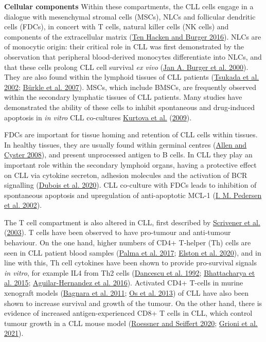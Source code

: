 \documentclass[11pt, a4paper, twosided]{book}
\begin{document}
\textbf{Cellular components}
Within these compartments, the CLL cells engage in a dialogue with mesenchymal stromal cells (MSCs), NLCs and follicular dendritic cells (FDCs), in concert with T cells, natural killer cells (NK cells) and components of the extracellular matrix (\protect\hyperlink{ref-tenHacken2016}{Ten Hacken and Burger 2016}). NLCs are of monocytic origin: their critical role in CLL was first demonstrated by the observation that peripheral blood-derived monocytes differentiate into NLCs, and that these cells prolong CLL cell survival \emph{ex vivo} (\protect\hyperlink{ref-Burger2000}{Jan A. Burger et al. 2000}). They are also found within the lymphoid tissues of CLL patients (\protect\hyperlink{ref-Tsukada2002}{Tsukada et al. 2002}; \protect\hyperlink{ref-Burkle2007}{Bürkle et al. 2007}). MSCs, which include BMSCs, are frequently observed within the secondary lymphatic tissues of CLL patients. Many studies have demonstrated the ability of these cells to inhibit spontaneous and drug-induced apoptosis in \emph{in vitro} CLL co-cultures \protect\hyperlink{ref-Kurtova2009}{Kurtova et al.} (\protect\hyperlink{ref-Kurtova2009}{2009}).

FDCs are important for tissue homing and retention of CLL cells within tissues. In healthy tissues, they are usually found within germinal centres (\protect\hyperlink{ref-Allen2008}{Allen and Cyster 2008}), and present unprocessed antigen to B cells. In CLL they play an important role within the secondary lymphoid organs, having a protective effect on CLL via cytokine secreton, adhesion molecules and the activation of BCR signalling (\protect\hyperlink{ref-Dubois2020}{Dubois et al. 2020}). CLL co-culture with FDCs leads to inhibition of spontaneous apoptosis and upregulation of anti-apoptotic MCL-1 (\protect\hyperlink{ref-Pedersen2002}{I. M. Pedersen et al. 2002}).

The T cell compartment is also altered in CLL, first described by \protect\hyperlink{ref-Scrivener2003}{Scrivener et al.} (\protect\hyperlink{ref-Scrivener2003}{2003}). T cells have been observed to have pro-tumour and anti-tumour behaviour. On the one hand, higher numbers of CD4+ T-helper (Th) cells are seen in CLL patient blood samples (\protect\hyperlink{ref-Palma2017}{Palma et al. 2017}; \protect\hyperlink{ref-Elston2020}{Elston et al. 2020}), and in line with this, Th cell cytokines have been shown to provide pro-survival signals \emph{in vitro}, for example IL4 from Th2 cells (\protect\hyperlink{ref-Dancescu1992}{Dancescu et al. 1992}; \protect\hyperlink{ref-Bhattacharya2015}{Bhattacharya et al. 2015}; \protect\hyperlink{ref-AguilarHernandez2016}{Aguilar-Hernandez et al. 2016}). Activated CD4+ T-cells in murine xenograft models (\protect\hyperlink{ref-Bagnara2011}{Bagnara et al. 2011}; \protect\hyperlink{ref-Os2013}{Os et al. 2013}) of CLL have also been shown to increase survival and growth of the tumour. On the other hand, there is evidence of increased antigen-experienced CD8+ T cells in CLL, which control tumour growth in a CLL mouse model (\protect\hyperlink{ref-Roessner2020}{Roessner and Seiffert 2020}; \protect\hyperlink{ref-Grioni2021}{Grioni et al. 2021}).
\end{document}

